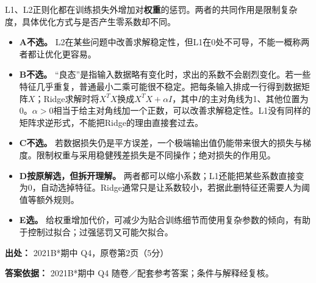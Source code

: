L1、L2正则化都在训练损失外增加对\textbf{权重}的惩罚。两者的共同作用是限制复杂度，具体优化方式与是否产生零系数却不同。



\begin{itemize}

\item \textbf{A不选。} L2在某些问题中改善求解稳定性，但L1在0处不可导，不能一概称两者都让优化更容易。

\item \textbf{B不选。} “良态”是指输入数据略有变化时，求出的系数不会剧烈变化。若一些特征几乎重复，普通最小二乘可能很不稳定。把每条输入排成一行得到数据矩阵\(X\)；Ridge求解时将\(X^TX\)换成\(X^TX+\alpha I\)，其中\(I\)的主对角线为1、其他位置为0。\(\alpha>0\)相当于给主对角线加一个正数，可以改善求解稳定性。L1没有同样的矩阵求逆形式，不能把Ridge的理由直接套过去。

\item \textbf{C不选。} 若数据损失仍是平方误差，一个极端输出值仍能带来很大的损失与梯度。限制权重与采用稳健残差损失是不同操作；绝对损失的作用见。

\item \textbf{D按原解选，但拆开理解。} 两者都可以缩小系数；L1还能把某些系数直接变为0，自动选掉特征。Ridge通常只是让系数较小，若据此删特征还需要人为阈值等额外规则。

\item \textbf{E选。} 给权重增加代价，可减少为贴合训练细节而使用复杂参数的倾向，有助于控制过拟合；过强惩罚又可能欠拟合。

\end{itemize}


\textbf{出处：} 2021B*期中 Q4，原卷第2页（5分）


\textbf{答案依据：} 2021B*期中 Q4 随卷／配套参考答案；条件与解释经复核。
